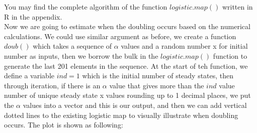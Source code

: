 \documentclass[12pt]{article}\usepackage[]{graphicx}\usepackage[]{color}
\begin{document}
You may find the complete algorithm of the function $logistic.map()$ written in R in the appendix.\\


Now we are going to estimate when the doubling occurs based on the numerical calculations. We could use similar argument as before, we create a function $doub()$ which takes a sequence of $\alpha$ values and a random number x for initial number as inputs, then we borrow the bulk in the $logistic.map()$ function to generate the last 201 elements in the sequence. At the start of teh function, we define a variable $ind = 1$ which is the initial number of steady states, then through iteration, if there is an $\alpha$ value that gives more than the $ind$ value number of unique steady state x values rounding up to 1 decimal places, we put the $\alpha$ values into a vector and this is our output, and then we can add vertical dotted lines to the existing logistic map to visually illustrate when doubling occurs. The plot is shown as following: 
\end{document}
